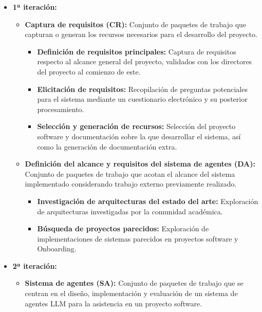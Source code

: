 \begin{itemize}
  \item\textbf{1ª iteración:}
    \begin{itemize}
      \item\textbf{Captura de requisitos (CR): }Conjunto de paquetes de trabajo que capturan o generan los recursos necesarios para el desarrollo del proyecto. 
            \begin{itemize}
          \item\textbf{Definición de requisitos principales: } Captura de requisitos respecto al alcance general del proyecto, validados con los directores del proyecto al comienzo de este.
          \item\textbf{Elicitación de requisitos: }Recopilación de preguntas potenciales para el sistema mediante un cuestionario electrónico y su posterior procesamiento.
        \end{itemize}
        \begin{itemize}
          \item\textbf{Selección y generación de recursos: }Selección del proyecto software y documentación sobre la que desarrollar el sistema, así como la generación de documentación extra.
        \end{itemize}
    \end{itemize}
    \begin{itemize}
      \item\textbf{Definición del alcance y requisitos del sistema de agentes (DA): }Conjunto de paquetes de trabajo que acotan el alcance del sistema implementado considerando trabajo externo previamente realizado.
        \begin{itemize}
          \item\textbf{Investigación de arquitecturas del estado del arte: }Exploración de arquitecturas investigadas por la comunidad académica.
        \end{itemize}
        \begin{itemize}
          \item\textbf{Búsqueda de proyectos parecidos: }Exploración de implementaciones de sistemas parecidos en proyectos software y Onboarding.
        \end{itemize}
    \end{itemize}
  \item\textbf{2ª iteración:}
    \begin{itemize}
      \item\textbf{Sistema de agentes (SA): }Conjunto de paquetes de trabajo que se centran en el diseño, implementación y evaluación de un sistema de agentes LLM para la asistencia en un proyecto software.

\end{itemize}
\end{itemize}
